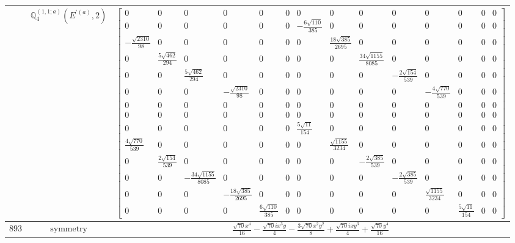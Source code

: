 \documentclass[fleqn,8pt,landscape]{jsarticle}
\begin{document}
\begin{longtable}{ccc}
$  $ & $ \mathbb{Q}_{4}^{(1,1;a)}(E^{\prime(a)},2) $ & $ \begin{bmatrix} 0 & 0 & 0 & 0 & 0 & 0 & 0 & 0 & 0 & 0 & 0 & 0 & 0 & 0 \\ 0 & 0 & 0 & 0 & 0 & 0 & - \frac{6 \sqrt{110}}{385} & 0 & 0 & 0 & 0 & 0 & 0 & 0 \\ - \frac{\sqrt{2310}}{98} & 0 & 0 & 0 & 0 & 0 & 0 & \frac{18 \sqrt{385}}{2695} & 0 & 0 & 0 & 0 & 0 & 0 \\ 0 & \frac{5 \sqrt{462}}{294} & 0 & 0 & 0 & 0 & 0 & 0 & \frac{34 \sqrt{1155}}{8085} & 0 & 0 & 0 & 0 & 0 \\ 0 & 0 & \frac{5 \sqrt{462}}{294} & 0 & 0 & 0 & 0 & 0 & 0 & - \frac{2 \sqrt{154}}{539} & 0 & 0 & 0 & 0 \\ 0 & 0 & 0 & - \frac{\sqrt{2310}}{98} & 0 & 0 & 0 & 0 & 0 & 0 & - \frac{4 \sqrt{770}}{539} & 0 & 0 & 0 \\ 0 & 0 & 0 & 0 & 0 & 0 & 0 & 0 & 0 & 0 & 0 & 0 & 0 & 0 \\ 0 & 0 & 0 & 0 & 0 & 0 & 0 & 0 & 0 & 0 & 0 & 0 & 0 & 0 \\ 0 & 0 & 0 & 0 & 0 & 0 & \frac{5 \sqrt{11}}{154} & 0 & 0 & 0 & 0 & 0 & 0 & 0 \\ \frac{4 \sqrt{770}}{539} & 0 & 0 & 0 & 0 & 0 & 0 & \frac{\sqrt{1155}}{3234} & 0 & 0 & 0 & 0 & 0 & 0 \\ 0 & \frac{2 \sqrt{154}}{539} & 0 & 0 & 0 & 0 & 0 & 0 & - \frac{2 \sqrt{385}}{539} & 0 & 0 & 0 & 0 & 0 \\ 0 & 0 & - \frac{34 \sqrt{1155}}{8085} & 0 & 0 & 0 & 0 & 0 & 0 & - \frac{2 \sqrt{385}}{539} & 0 & 0 & 0 & 0 \\ 0 & 0 & 0 & - \frac{18 \sqrt{385}}{2695} & 0 & 0 & 0 & 0 & 0 & 0 & \frac{\sqrt{1155}}{3234} & 0 & 0 & 0 \\ 0 & 0 & 0 & 0 & \frac{6 \sqrt{110}}{385} & 0 & 0 & 0 & 0 & 0 & 0 & \frac{5 \sqrt{11}}{154} & 0 & 0 \end{bmatrix} $ \\ \hline
$ 893 $ & $ \text{symmetry} $ & $ \frac{\sqrt{70} x^{4}}{16} - \frac{\sqrt{70} i x^{3} y}{4} - \frac{3 \sqrt{70} x^{2} y^{2}}{8} + \frac{\sqrt{70} i x y^{3}}{4} + \frac{\sqrt{70} y^{4}}{16} $ \\

\end{longtable}
\end{document}
